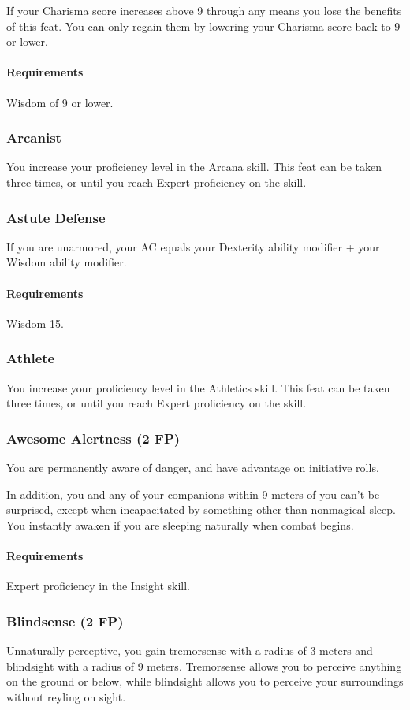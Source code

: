    If your Charisma score increases above 9 through any means you lose the benefits of this feat.
    You can only regain them by lowering your Charisma score back to 9 or lower.
    \paragraph{Requirements} Wisdom of 9 or lower.
\subsubsection{Arcanist} \label{feat::arcanist}
    You increase your proficiency level in the Arcana skill.
    This feat can be taken three times, or until you reach Expert proficiency on the skill.
\subsubsection{Astute Defense} \label{feat::astutedefense}
    If you are unarmored, your AC equals your Dexterity ability modifier + your Wisdom ability modifier.
    \paragraph{Requirements} Wisdom 15.
\subsubsection{Athlete} \label{feat::athlete}
    You increase your proficiency level in the Athletics skill.
    This feat can be taken three times, or until you reach Expert proficiency on the skill.
\subsubsection{Awesome Alertness (2 FP)} \label{feat::awesomealertness}
    You are permanently aware of danger, and have advantage on initiative rolls.

    In addition, you and any of your companions within 9 meters of you can't be surprised, except when incapacitated by something other than nonmagical sleep.
    You instantly awaken if you are sleeping naturally when combat begins.
    \paragraph{Requirements} Expert proficiency in the Insight skill.
\subsubsection{Blindsense (2 FP)} \label{feat::blindsense}
    Unnaturally perceptive, you gain tremorsense with a radius of 3 meters and blindsight with a radius of 9 meters.
    Tremorsense allows you to perceive anything on the ground or below, while blindsight allows you to perceive your surroundings without reyling on sight.

